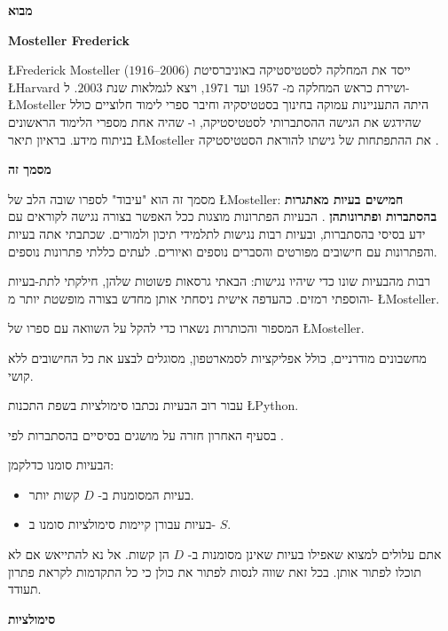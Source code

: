 \tableofcontents

\newpage

\begin{center}
\textbf{\Large מבוא}
\end{center}


\bigskip

\textbf{Mosteller Frederick}

\L{Frederick Mosteller}
($1916$--$2006$)
ייסד את המחלקה לסטטיסטיקה באוניברסיטת 
\L{Harvard}
ושירת כראש המחלקה מ-%
$1957$
ועד
$1971$,
ויצא לגמלאות שנת
$2003$.
ל-%
\L{Mosteller}
היתה התעניינות עמוקה בחינוך בסטטיסקיה וחיבר ספרי לימוד חלוציים כולל 
\cite{pwsa}
שהידגש את הגישה ההסתברותי לסטטיסטיקה, ו-%
\cite{bsda}
שהיה אחת מספרי הלימוד הראשונים בניתוח מידע. בראיון תיאר 
\L{Mosteller}
את ההתפתחות של גישתו להוראת הסטטיסטיקה
\cite{gse}.

\medskip

\textbf{מסמך זה}

מסמך זה הוא "עיבוד" לספרו שובה הלב של 
\L{Mosteller}: 
\textbf{חמישים בעיות מאתגרות בהסתברות ופתרונותהן}
\cite{fifty}.
הבעיות הפתרונות מוצגות ככל האפשר בצורה נגישה לקוראים עם ידע בסיסי בהסתברות, ובעיות רבות נגישות לתלמידי תיכון ולמורים. שכתבתי אתה בעיות והפתרונות עם חישובים מפורטים והסברים נוספים ואיורים. לעתים כללתי פתרונות נוספים.

רבות מהבעיות שונו כדי שיהיו נגישות: הבאתי גרסאות פשוטות שלהן, חילקתי לתת-בעיות והוספתי רמזים. כהעדפה אישית ניסחתי אותן מחדש בצורה מופשטת יותר מ-%
\L{Mosteller}.

המספור והכותרות נשארו כדי להקל על השוואה עם ספרו של
\L{Mosteller}.

מחשבונים מודרניים, כולל אפליקציות לסמארטפון, מסוגלים לבצע את כל החישובים ללא קושי.

עבור רוב הבעיות נכתבו סימולציות בשפת התכנות 
\L{Python}.

בסעיף האחרון חזרה על מושגים בסיסיים בהסתברות לפי
\cite{ross}.

הבעיות סומנו כדלקמן:
\begin{itemize}
\item 
בעיות המסומנות ב-%
$D$
קשות יותר.
\item
בעיות עבורן קיימות סימולציות סומנו ב-%
$S$.
\end{itemize}
אתם עלולים למצוא שאפילו בעיות שאינן מסומנות ב-%
$D$
הן קשות. אל נא להתייאש אם לא תוכלו לפתור אותן. בכל זאת שווה לנסות לפתור את כולן כי כל התקדמות לקראת פתרון תעודד.


\textbf{סימולציות}


